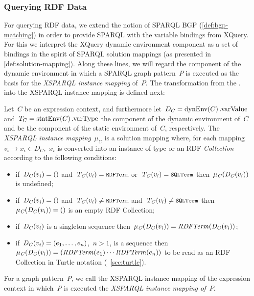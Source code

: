 
\subsubsection{Querying RDF Data}
\label{sec:bf-extended-bgp}
%
For querying \ac{RDF} data, we extend the notion of SPARQL \ac{BGP} (\cref{def:bgp-matching}) in order to provide SPARQL
with the variable bindings from XQuery.
%
For this we interpret the XQuery  dynamic environment component as a set of bindings in the spirit of
SPARQL solution mappings (as presented in \cref{def:solution-mapping}).
%
Along these lines, we will regard the  component of the dynamic environment in which a SPARQL graph
pattern~$P$ is executed as the basis for the \emph{XSPARQL instance mapping} of~$P$.  The transformation from the
\dyn. into the XSPARQL instance mapping is defined next:
%
\begin{definition}
  \label{def:xml2rdfterm}
  Let~$C$ be an expression context, and furthermore let~$D_C = \mathit{{\textrm{dynEnv}}}\!\left(C\right).\textrm{varValue}$ and~$T_C =
  \mathit{\mathrm{statEnv}}\!\left(C\right).\textrm{varType}$ the  component of the dynamic environment of~$C$ and be the
   component of the static environment of~$C$, respectively.
  The \emph{XSPARQL instance mapping}~$\mu_C$ is a solution mapping where, for each mapping~$v_{i} \rightarrow x_{i} \in
  D_C$,~$x_{i}$ is converted into an instance of type  or an \ac{RDF} \emph{Collection} according to the
  following conditions:
  \begin{itemize}[noitemsep]
  \item if~$\mathit{D_C}\!\left(v_{i}\right) = \left(\right)$ and~$\mathit{T_C}\!\left(v_{i}\right) = \texttt{{\small RDFTerm}}$ or~$\mathit{T_C}\!\left(v_{i}\right) =
    \texttt{{\small SQLTerm}}$ then~$\mathit{\mu_C}\!\left(\mathit{D_C}\!\left(v_{i}\right)\right)$ is undefined;
  \item if~$\mathit{D_C}\!\left(v_{i}\right) = \left(\right)$ and~$\mathit{T_C}\!\left(v_{i}\right) \neq \texttt{{\small RDFTerm}}$ and~$\mathit{T_C}\!\left(v_{i}\right)
    \neq \texttt{{\small SQLTerm}}$ then~$\mathit{\mu_C}\!\left(\mathit{D_C}\!\left(v_{i}\right)\right) = \left(\right)$ is an empty \ac{RDF} Collection;
  \item if~$\mathit{D_C}\!\left(v_{i}\right)$ is a singleton sequence then~$\mathit{\mu_C}\!\left(\mathit{D_C}\!\left(v_{i}\right)\right) =
    \mathit{RDFTerm}\!\left(\mathit{D_C}\!\left(v_{i}\right)\right)$;
  \item if~$\mathit{D_C}\!\left(v_{i}\right) = \left(e_{1}, \dotsc, e_{n}\right)$,~$n > 1$, is a sequence
    then~$\mathit{\mu_C}\!\left(\mathit{D_C}\!\left(v_{i}\right)\right) = \left(\mathit{RDFTerm}\!\left(e_{1}\right) \dotsb \mathit{RDFTerm}\!\left(e_{n}\right)\right)$ to
    be read as an \ac{RDF} Collection in Turtle notation (\cf~\cref{sec:turtle}).
  \end{itemize}
  For a graph pattern~$P$, we call the XSPARQL instance mapping of the expression context in which~$P$ is executed the
  \emph{XSPARQL instance mapping of~$P$}.
\end{definition}

